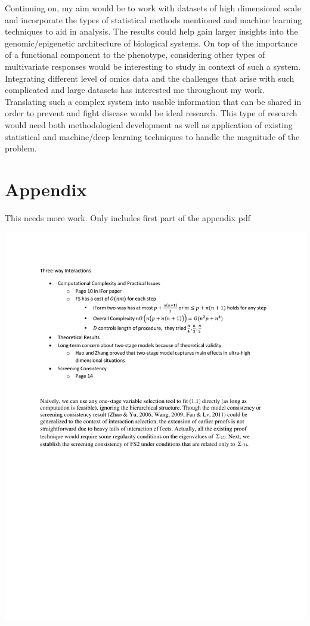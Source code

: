 \documentclass[11pt,]{book}
\theoremstyle{definition}
\theoremstyle{definition}
\theoremstyle{remark}
\begin{document}
Continuing on, my aim would be to work with datasets of high dimensional
scale and incorporate the types of statistical methods mentioned and
machine learning techniques to aid in analysis. The results could help
gain larger insights into the genomic/epigenetic architecture of
biological systems. On top of the importance of a functional component
to the phenotype, considering other types of multivariate responses
would be interesting to study in context of such a system. Integrating
different level of omics data and the challenges that arise with such
complicated and large datasets has interested me throughout my work.
Translating such a complex system into usable information that can be
shared in order to prevent and fight disease would be ideal research.
This type of research would need both methodological development as well
as application of existing statistical and machine/deep learning
techniques to handle the magnitude of the problem.

\chapter{Appendix}\label{appendix}

This needs more work. Only includes first part of the appendix pdf

\begin{center} 
\includegraphics[width=8in]{appendix.pdf} 
\end{center}


\end{document}
